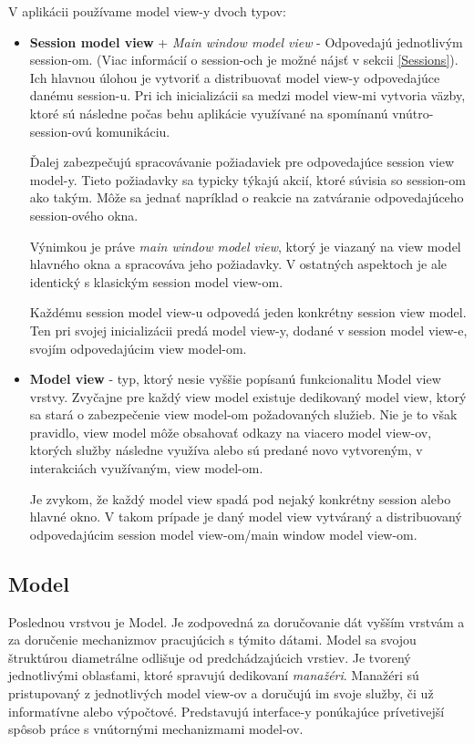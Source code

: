 V aplikácii používame model view-y dvoch typov:
\begin{itemize}
    \item \textbf{Session model view} + \textit{Main window model view}  - Odpovedajú jednotlivým session-om. (Viac informácií o session-och je možné nájsť v sekcii \ref{Sessions}). Ich hlavnou úlohou je vytvoriť a distribuovať model view-y odpovedajúce danému session-u. Pri ich inicializácii sa medzi model view-mi vytvoria väzby, ktoré sú následne počas behu aplikácie využívané na spomínanú vnútro-session-ovú komunikáciu. 
    
    Ďalej zabezpečujú spracovávanie požiadaviek pre odpovedajúce session view model-y. Tieto požiadavky sa typicky týkajú akcií, ktoré súvisia so session-om ako takým. Môže sa jednať napríklad o reakcie na zatváranie odpovedajúceho session-ového okna.  
    
    Výnimkou je práve \textit{main window model view}, ktorý je viazaný na view model hlavného okna a spracováva jeho požiadavky. V ostatných aspektoch je ale identický s klasickým session model view-om.
    
    Každému session model view-u odpovedá jeden konkrétny session view model. Ten pri svojej inicializácii predá model view-y, dodané v session model view-e, svojím odpovedajúcim view model-om.   
    \item \textbf{Model view} - typ, ktorý nesie vyššie popísanú funkcionalitu Model view vrstvy. Zvyčajne pre každý view model existuje dedikovaný model view, ktorý sa stará o zabezpečenie view model-om požadovaných služieb. Nie je to však pravidlo, view model môže obsahovať odkazy na viacero model view-ov, ktorých služby následne využíva alebo sú predané novo vytvoreným, v interakciách využívaným, view model-om.

    Je zvykom, že každý model view spadá pod nejaký konkrétny session alebo hlavné okno. V takom prípade je daný model view vytváraný a distribuovaný odpovedajúcim session model view-om/main window model view-om.  
\end{itemize}

\subsection{Model}\label{model}

Poslednou  vrstvou je Model. Je zodpovedná za doručovanie dát vyšším vrstvám a za doručenie mechanizmov pracujúcich s týmito dátami. Model sa svojou štruktúrou diametrálne odlišuje od predchádzajúcich vrstiev. Je tvorený jednotlivými oblasťami, ktoré spravujú dedikovaní \textit{manažéri}. Manažéri sú pristupovaný z jednotlivých model view-ov a doručujú im svoje služby, či už informatívne alebo výpočtové. Predstavujú interface-y ponúkajúce prívetivejší spôsob práce s vnútornými mechanizmami model-ov. 

